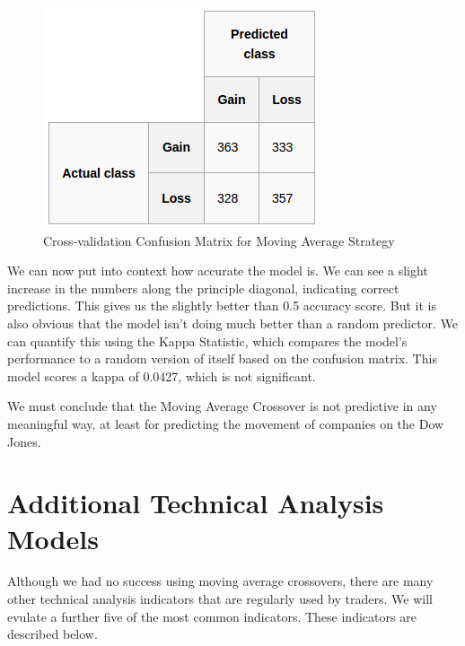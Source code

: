 \documentclass{report}
\begin{document}
\begin{figure}[H]
	\caption{Cross-validation Confusion Matrix for Moving Average Strategy}
	\centerline{\includegraphics[scale=0.75]{vis/ma_confusion.png}}
	\label{fig:ma-confusion}
\end{figure}

We can now put into context how accurate the model is. We can see a slight increase in the numbers along the principle diagonal, indicating correct predictions. This gives us the slightly better than 0.5 accuracy score. But it is also obvious that the model isn't doing much better than a random predictor. We can quantify this using the Kappa Statistic, which compares the model's performance to a random version of itself based on the confusion matrix. This model scores a kappa of 0.0427, which is not significant. 

We must conclude that the Moving Average Crossover is not predictive in any meaningful way, at least for predicting the movement of companies on the Dow Jones.

\section{Additional Technical Analysis Models}

Although we had no success using moving average crossovers, there are many other technical analysis indicators that are regularly used by traders. We will evulate a further five of the most common indicators. These indicators are described below.
\end{document}
